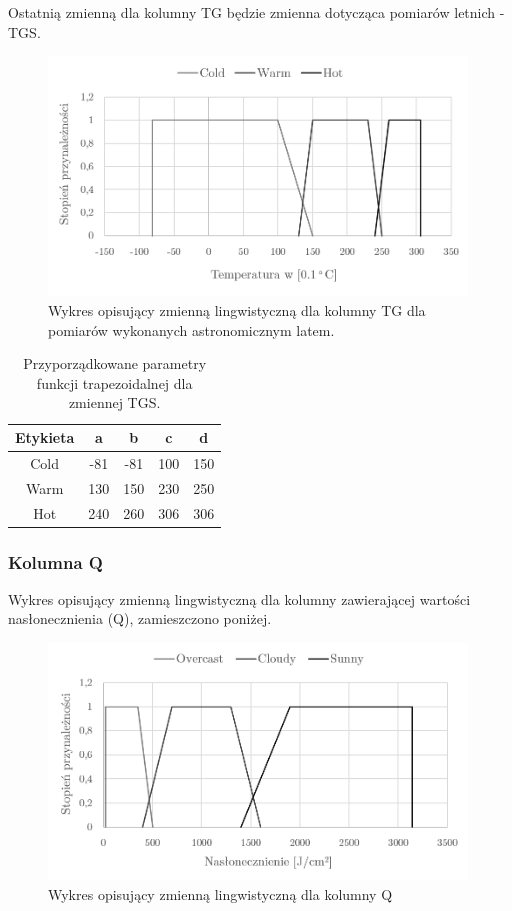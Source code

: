 \documentclass{classrep}
\begin{document}
Ostatnią zmienną dla kolumny TG będzie zmienna dotycząca pomiarów letnich - TGS.
\begin{figure}[H]
	\centering
	\includegraphics[width=0.99\textwidth]{Pictures/TermsCharts/TG_L.png}
	\caption{Wykres opisujący zmienną lingwistyczną dla kolumny TG dla pomiarów wykonanych astronomicznym latem.}
\end{figure}

\begin{table}[H]
	\centering
	\begin{tabular}{c c c c c} 
		\hline
		\textbf{Etykieta} & \textbf{a} & \textbf{b} & \textbf{c} & \textbf{d}\\ [0.5ex] 
		\hline
		\hline 
Cold	 &-81 & -81 & 100 & 150 \\
Warm & 130 & 150 & 230 & 250 \\
Hot	 & 240 & 260 & 306 & 306 \\
		\hline
	\end{tabular}
	\caption{Przyporządkowane parametry funkcji trapezoidalnej dla zmiennej TGS.}
\end{table}






\subsubsection{Kolumna Q}
Wykres opisujący zmienną lingwistyczną dla kolumny zawierającej wartości nasłonecznienia (Q), zamieszczono poniżej.
\begin{figure}[H]
	\centering
	\includegraphics[width=0.99\textwidth]{Pictures/TermsCharts/Q.png}
	\caption{Wykres opisujący zmienną lingwistyczną dla kolumny Q}
\end{figure}
\end{document}
